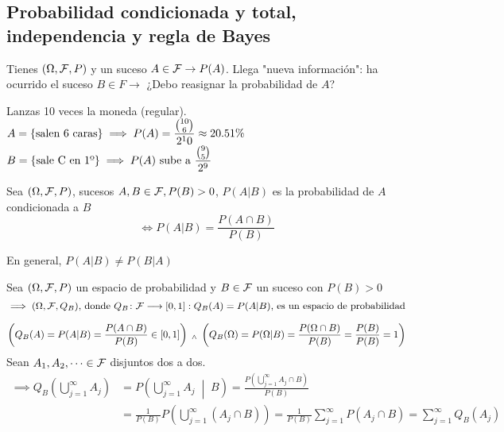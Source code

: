 \subsection{Probabilidad condicionada y total, independencia y regla de Bayes}
Tienes $(\Omega, \mathcal{F}, P)$ y un suceso $A\in \mathcal{F} \rightarrow P(A)$. Llega "nueva información": ha ocurrido el suceso $B\in F \rightarrow$ ¿Debo reasignar la probabilidad de $A$?
\begin{ejem}
    Lanzas 10 veces la moneda (regular). \\
    $\displaystyle A=\{\text{salen 6 caras}\} \implies P(A)=\frac{\binom{10}{6}}{2^10} \approx 20.51 \%$
    $\displaystyle B=\{\text{sale C en 1º}\} \implies P(A)\text{ sube a }\frac{\binom{9}{5}}{2^9}$
\end{ejem}

\begin{defn}
    Sea $(\Omega, \mathcal{F}, P)$, sucesos $A, B \in \mathcal{F}, P(B)>0$, $P(A|B)$ es la probabilidad de $A$ condicionada a $B$
    \[\iff P(A|B)=\frac{P(A\cap B)}{P(B)}\]
    \begin{obs}
        En general, $P(A|B)\ne P(B|A)$
    \end{obs}
\end{defn}
\begin{prop}
    Sea $(\Omega, \mathcal{F}, P)$ un espacio de probabilidad y $B \in \mathcal{F}$ un suceso con $P(B)>0$
    \[\implies (\Omega, \mathcal{F}, Q_B) \text{, donde } Q_B \colon \mathcal{F} \longrightarrow \left[0,1\right]:Q_B(A)=P(A|B) \text{, es un espacio de probabilidad}\]
    \begin{dem}
        \[\left(Q_B(A)=P(A|B)=\frac{P(A\cap B)}{P(B)} \in \left[0, 1\right]\right) \; _{\wedge} \; \left(Q_B(\Omega)=P(\Omega|B)=\frac{P(\Omega\cap B)}{P(B)}=\frac{P(B)}{P(B)}=1\right)\]
        Sean $A_1, A_2, \dots \in \mathcal{F}$ disjuntos dos a dos.
        \begin{equation*}
            \begin{split}
                \implies Q_B\left(\bigcup_{j=1}^\infty A_j\right)&=P\left(\bigcup_{j=1}^\infty A_j\;\middle|\; B\right)=\frac{P\left(\bigcup_{j=1}^\infty A_j \cap B\right)}{P(B)}\\
                &=\frac{1}{P(B)}P\left(\bigcup_{j=1}^\infty (A_j \cap B)\right)=\frac{1}{P(B)}\sum_{j=1}^\infty P(A_j\cap B) = \sum_{j=1}^\infty Q_B(A_j)
            \end{split}
        \end{equation*}
    \end{dem}
\end{prop}

